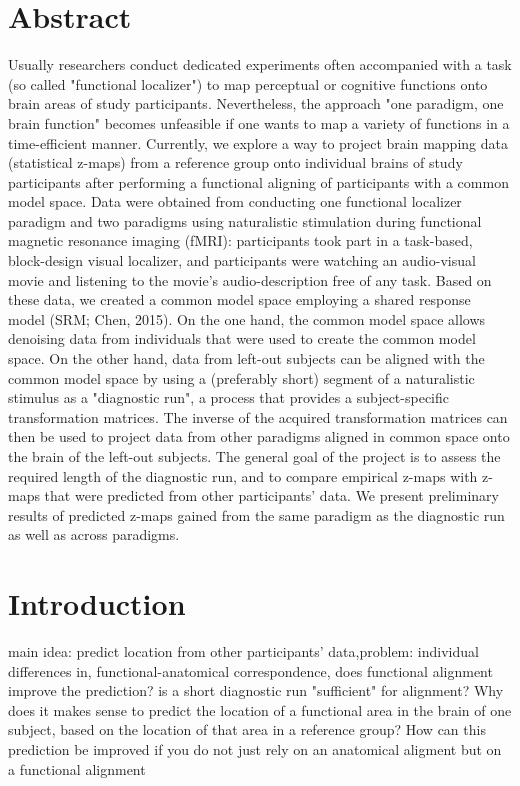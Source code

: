 \section{Abstract}
%
Usually researchers conduct dedicated experiments often
accompanied with a task (so called "functional localizer") to map perceptual or
cognitive functions onto brain areas of study participants.
%
Nevertheless, the approach "one paradigm, one brain function" becomes
unfeasible if one wants to map a variety of functions in a time-efficient
manner.
%
Currently, we explore a way to project brain mapping data (statistical z-maps)
from a reference group onto individual brains of study participants after
performing a functional aligning of participants with a common model space.
%
Data were obtained from conducting one functional localizer paradigm and two
paradigms using naturalistic stimulation during functional magnetic resonance
imaging (fMRI): participants took part in a task-based, block-design visual
localizer, and participants were watching an audio-visual movie and listening
to the movie's audio-description free of any task.
%
Based on these data, we created a common model space employing a shared
response model (SRM; Chen, 2015).
%
On the one hand, the common model space allows denoising data from individuals
that were used to create the common model space.
%
On the other hand, data from left-out subjects can be aligned with the common
model space by using a (preferably short) segment of a naturalistic stimulus as
a "diagnostic run", a process that provides a subject-specific transformation
matrices.
%
The inverse of the acquired transformation matrices can then be used to project
data from other paradigms aligned in common space onto the brain of the
left-out subjects.
%
The general goal of the project is to assess the required length of the
diagnostic run, and to compare empirical z-maps with z-maps that were predicted
from other participants' data.
%
We present preliminary results of predicted z-maps gained from the same
paradigm as the diagnostic run as well as across paradigms.


\section{Introduction}



main idea: predict location from other participants' data,problem: individual
differences in, functional-anatomical correspondence, does functional alignment
improve the prediction? is a short diagnostic run "sufficient" for alignment?
%
Why does it makes sense to predict the location of a functional area in the
brain of one subject, based on the location of that area in a reference group?
%
How can this prediction be improved if you do not just rely on an anatomical
aligment but on a functional alignment

